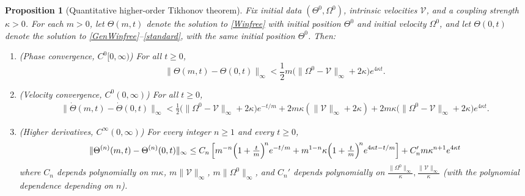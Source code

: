 \documentclass[11pt,reqno]{amsart}
\newtheorem{proposition}[lemma]{Proposition}
\theoremstyle{definition}
\theoremstyle{remark}
\begin{document}
\begin{proposition}[Quantitative higher-order Tikhonov theorem]\label{prop:mto0quant}
Fix initial data $(\Theta^0,\Omega^0)$, intrinsic velocities $\mathcal V$,
and a coupling strength $\kappa>0$. For each $m>0$, let $\Theta(m,t)$ denote the solution to \eqref{Winfree} with initial position $\Theta^0$ and initial velocity $\Omega^0$, and let $\Theta(0,t)$ denote the solution to \eqref{GenWinfree}--\eqref{standard}, with the same
initial position $\Theta^0$. Then:
\begin{enumerate}
\item \emph{(Phase convergence, $C^0[0,\infty)$)} For all $t\ge 0$,
\begin{equation}\label{eq:tik-phase}
\|\Theta(m,t)-\Theta(0,t)\|_\infty < \frac 12 m \Big(\|\Omega^0-\mathcal{V}\|_\infty+2\kappa \Big )e^{4\kappa t}.
\end{equation}

\item \emph{(Velocity convergence, $C^0(0,\infty)$)} For all $t\ge 0$,
\begin{multline}\label{eq:tik-vel}
	\|\dot\Theta(m,t)-\dot\Theta(0,t)\|_\infty<\frac 12\Big(\|\Omega^0-\mathcal{V}\|_\infty+2\kappa \Big)e^{-t/m}+ 2m\kappa(\|\mathcal{V}\|_\infty+2\kappa) +2m\kappa \Big (\|\Omega^0-\mathcal{V}\|_\infty+2\kappa\Big )e^{4\kappa t}.
\end{multline}

\item \emph{(Higher derivatives, $C^\infty(0,\infty)$)} For every
integer $n\ge 1$ and every $t\ge 0$,
\begin{equation}\label{eq:tik-higher}
\|\Theta^{(n)}(m,t)-\Theta^{(n)}(0,t)\|_\infty
\le C_n \left[m^{-n}\Bigl(1+\tfrac{t}{m}\Bigr)^{\!n}e^{-t/m}+m^{1-n}\kappa \Bigl(1+\tfrac{t}{m}\Bigr)^{\!n} e^{4\kappa t-t/m}\right]+C_n'm\kappa^{n+1} e^{4\kappa t}
\end{equation}
where $C_n$ depends polynomially on $m\kappa$,
$m\|\mathcal V\|_\infty$, $m\|\Omega^0\|_\infty$, and $C_n'$ depends polynomially on $\frac{\|\Omega^0\|_\infty}{\kappa},\frac{\|\mathcal{V}\|_\infty}\kappa$ (with the polynomial dependence depending on $n$).
\end{enumerate}
\end{proposition}
\end{document}
